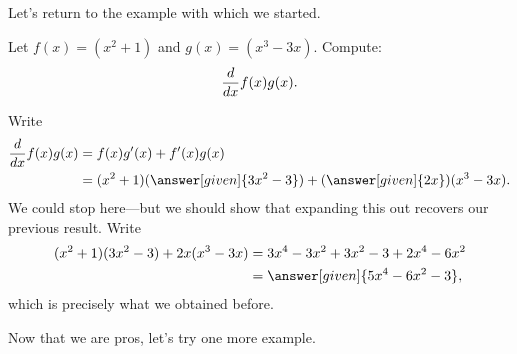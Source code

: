 \documentclass{ximera}
\begin{document}



Let's return to the example with which we started.
\begin{example} 
Let $f(x)=(x^2+1)$ and $g(x)=(x^3-3x)$. Compute:
\[
\frac{d}{dx} f(x)g(x).
\]

\begin{explanation}
Write
\begin{align*}
\ddx f(x)g(x) &= f(x)g'(x) + f'(x)g(x)\\
&=(x^2+1)(\answer[given]{3x^2-3}) + (\answer[given]{2x})(x^3-3x).
\end{align*}
We could stop here---but we should show that expanding this out recovers our previous result. Write
\begin{align*}
(x^2+1)(3x^2-3) + 2x(x^3-3x) &= 3x^4-3x^2 +3x^2 -3 + 2x^4-6x^2\\
&=\answer[given]{5x^4-6x^2-3},
\end{align*}
which is precisely what we obtained before.
\end{explanation}
\end{example}

Now that we are pros, let's try one more example.
\end{document}
